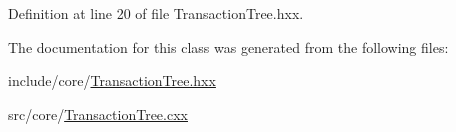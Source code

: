 Definition at line 20 of file Transaction\+Tree.\+hxx.



The documentation for this class was generated from the following files\+:\begin{DoxyCompactItemize}
\item 
include/core/\mbox{\hyperlink{_transaction_tree_8hxx}{Transaction\+Tree.\+hxx}}\item 
src/core/\mbox{\hyperlink{_transaction_tree_8cxx}{Transaction\+Tree.\+cxx}}\end{DoxyCompactItemize}
